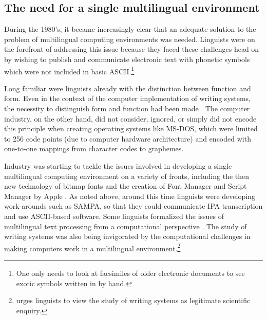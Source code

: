 \subsection{The need for a single multilingual environment}

During the 1980's, it became increasingly clear that an adequate solution 
to the problem of multilingual computing environments was needed. Linguists 
were on the forefront of addressing this issue because they faced these 
challenges head-on by wishing to publish and communicate electronic text 
with phonetic symbols which were not included in basic ASCII.\footnote{One 
only needs to look at facsimiles of older electronic documents to see exotic 
symbols written in by hand.}

Long familiar were linguists already with the distinction between function 
and form. Even in the context of the computer implementation of writing systems, 
the necessity to distinguish form and function had been made \citep{Becker1984}. 
The computer industry, on the other hand, did not consider, ignored, or simply 
did not encode this principle when creating operating systems like MS-DOS, which 
were limited to 256 code points (due to computer hardware architecture) and 
encoded with one-to-one mappings from character codes to graphemes.

Industry was starting to tackle the issues involved in developing a single 
multilingual computing environment on a variety of fronts, including the then 
new technology of bitmap fonts and the creation of Font Manager and Script 
Manager by Apple \citep{Apple1985,Apple1986,Apple1988}. As noted above, around 
this time linguists were developing work-arounds such as SAMPA, so that they 
could communicate IPA transcription and use ASCII-based software. Some linguists 
formalized the issues of multilingual text processing from a computational 
perspective \citep{Anderson1984,Becker1984,Simons1989}. The study of writing 
systems was also being invigorated by the computational challenges in making 
computers work in a multilingual environment.\footnote{\cite[11--15]{Sampson1985} 
urges linguists to view the study of writing systems as legitimate scientific enquiry.}


